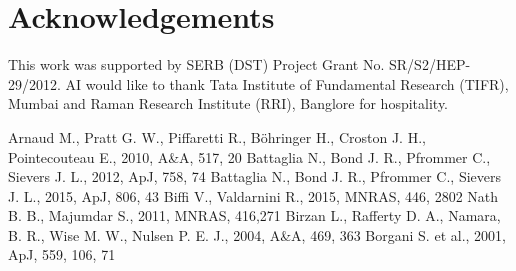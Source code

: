 \documentclass[a4paper,fleqn,usenatbib]{mnras}
\begin{document}
\section*{Acknowledgements}
This work was supported by SERB (DST) Project Grant No. SR/S2/HEP-29/2012. AI would like to thank Tata Institute of Fundamental Research (TIFR), Mumbai and Raman Research Institute (RRI), Banglore for hospitality.
\footnotesize{
    
\begin{thebibliography}{}
Arnaud M., Pratt G. W., Piffaretti R., B{\"o}hringer H., Croston J. H., Pointecouteau E., 2010, A\&A, 517, 20
Battaglia N., Bond J. R., Pfrommer C., Sievers J. L., 2012, ApJ, 758, 74
Battaglia N., Bond J. R., Pfrommer C., Sievers J. L., 2015, ApJ, 806, 43
Biffi V., Valdarnini R., 2015, MNRAS, 446, 2802
Nath B. B., Majumdar S., 2011, MNRAS, 416,271
Birzan L., Rafferty D. A., Namara, B. R., Wise M. W., Nulsen P. E. J., 2004, A\&A, 469, 363
Borgani S. et al., 2001, ApJ, 559, 106, 71

\end{thebibliography}}
\end{document}
